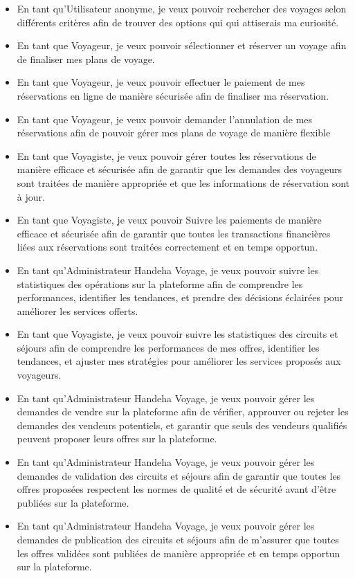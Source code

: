 \documentclass[12pt]{report}
\begin{document}
\begin{itemize}
					\item En tant qu'Utilisateur anonyme, je veux pouvoir rechercher des voyages selon différents critères afin de trouver des options qui qui attiserais ma curiosité.
					\item En tant que Voyageur, je veux pouvoir sélectionner et réserver un voyage afin de finaliser mes plans de voyage.
					\item En tant que Voyageur, je veux pouvoir effectuer le paiement de mes réservations en ligne de manière sécurisée afin de finaliser ma réservation.
					\item En tant que Voyageur, je veux pouvoir demander l'annulation de mes réservations afin de pouvoir gérer mes plans de voyage de manière flexible
					\item En tant que Voyagiste, je veux pouvoir gérer toutes les réservations de manière efficace et sécurisée afin de garantir que les demandes des voyageurs sont traitées de manière appropriée et que les informations de réservation sont à jour.
					\item En tant que Voyagiste, je veux pouvoir Suivre les paiements de manière efficace et sécurisée afin de garantir que toutes les transactions financières liées aux réservations sont traitées correctement et en temps opportun.
					\item En tant qu'Administrateur Handeha Voyage, je veux pouvoir suivre les statistiques des opérations sur la plateforme afin de comprendre les performances, identifier les tendances, et prendre des décisions éclairées pour améliorer les services offerts.
					\item En tant que Voyagiste, je veux pouvoir suivre les statistiques des circuits et séjours afin de comprendre les performances de mes offres, identifier les tendances, et ajuster mes stratégies pour améliorer les services proposés aux voyageurs.
					\item En tant qu'Administrateur Handeha Voyage, je veux pouvoir gérer les demandes de vendre sur la plateforme afin de vérifier, approuver ou rejeter les demandes des vendeurs potentiels, et garantir que seuls des vendeurs qualifiés peuvent proposer leurs offres sur la plateforme.	
					\item En tant qu'Administrateur Handeha Voyage, je veux pouvoir gérer les demandes de validation des circuits et séjours afin de garantir que toutes les offres proposées respectent les normes de qualité et de sécurité avant d'être publiées sur la plateforme.
					\item En tant qu'Administrateur Handeha Voyage, je veux pouvoir gérer les demandes de publication des circuits et séjours afin de m'assurer que toutes les offres validées sont publiées de manière appropriée et en temps opportun sur la plateforme.

\end{itemize}
\end{document}
